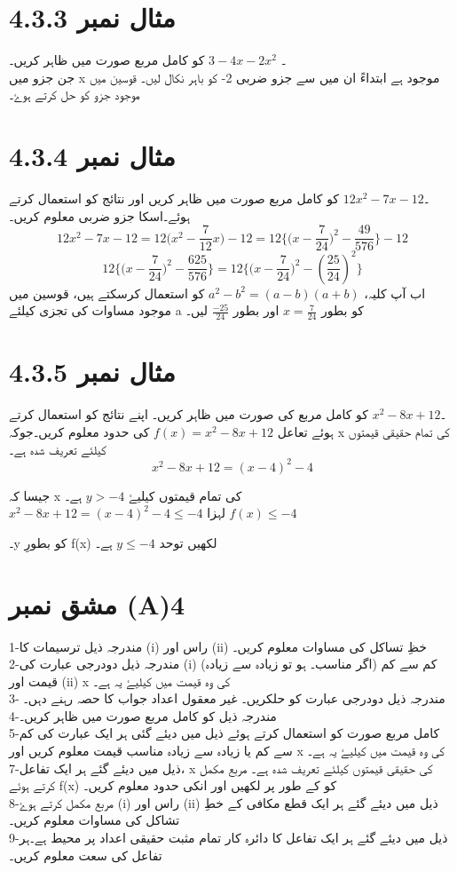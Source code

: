 \section{ مثال نمبر 4.3.3}
۔ \(3-4x-2x^{2}\) کو کامل مربع صورت میں ظاہر کریں۔\\
 جن جزو میں x موجود ہے ابتداءً ان میں سے جزو ضربی 2- کو باہر نکال لیں۔ قوسین میں موجود جزو کو حل کرتے ہوۓ۔
\section{ مثال نمبر 4.3.4}
۔\(12x^{2}-7x-12\) کو کامل مربع صورت میں ظاہر کریں اور نتائج کو استعمال کرتے ہوئے۔اسکا جزو ضربی معلوم کریں۔
\[12x^{2}-7x-12=12\big(x^{2}-\frac{7}{12}x\big)-12=12\big\{\big(x-\frac{7}{24}\big)^{2}-\frac{49}{576}\big\}-12\]
\[12\big\{\big(x-\frac{7}{24}\big)^{2}-\frac{625}{576}\big\}=12\big\{\big(x-\frac{7}{24}\big)^{2}-(\frac{25}{24})^{2}\big\}\]
 اب آپ کلیہ، \(a^{2}-b^{2}=(a-b)(a+b)\) کو استعمال کرسکتے ہیں، قوسین میں موجود مساوات کی تجزی کیلئے a کو بطور \(x=\frac{7}{24}\) اور بطور \(\frac{-25}{24}\) لیں۔\\
\section{ مثال نمبر 4.3.5}
۔\(x^2-8x+12\) کو کامل مربع کی صورت میں ظاہر کریں۔ اپنے نتائج کو استعمال کرتے ہوئے تعاعل \(f(x)=x^2-8x+12\) کی حدود معلوم کریں۔جوکہ x کی تمام حقیقی قیمتوں کیلئے تعریف شدہ ہے۔\\
    \[x^2-8x+12=(x-4)^2-4\]

 جیسا کہ x کی تمام قیمتوں کیلیۓ  \(y>-4\) ہے۔\\
 \(x^2-8x+12=(x-4)^2-4 \leq -4\)
 لہزا
    \(f(x) \leq -4\)
   
۔y کو بطورِ f(x)  لکھیں توحد \(y\leq -4\) ہے۔
 \section{مشق نمبر (A)4}
 1-مندرجہ ذیل ترسیمات کا (i) راس اور (ii) خظِ تساکل کی مساوات معلوم کریں۔\\
 2-مندرجہ ذیل دودرجی عبارت کی (i) کم سے کم (اگر مناسب۔ ہو تو زیادہ سے زیادہ) قیمت اور (ii) x کی وہ قیمت میں کیلیۓ یہ ہے۔\\
 3- مندرجہ ذیل دودرجی عبارت کو حلکریں۔ غیر معقول اعداد جواب کا حصہ رہنے دہں۔\\
 4-مندرجہ ذیل کو کامل مربع صورت میں ظاہر کریں۔\\
 5-کامل مربع صورت کو استعمال کرتے ہوئے ذیل میں دیئے گئی ہر ایک عبارت کی کم سے کم یا زیادہ سے زیادہ مناسب قیمت معلوم کریں اور x کی وہ قیمت میں کیلیۓ یہ ہے۔\\
\newpage
 7-ذیل میں دیئے گئے ہر ایک تفاعل، x کی  حقیقی قیمتوں کیلئے تعریف شدہ ہے۔ مربع مکمل کرتے ہوئے f(x) کو
 کے طور پر لکھیں اور انکی حدود معلوم کریں۔\\
 8-مربع مکمل کرتے ہوۓ (i) راس اور (ii) ذیل میں دیئے گئے ہر ایک قطع مکافی کے خطِ تشاکل کی مساوات معلوم کریں۔\\
 9-ذیل میں دیئے گئے ہر ایک تفاعل کا دائرہ کار تمام مثبت حقیقی اعداد پر محیط ہے۔ہر تفاعل کی سعت معلوم کریں۔\\
